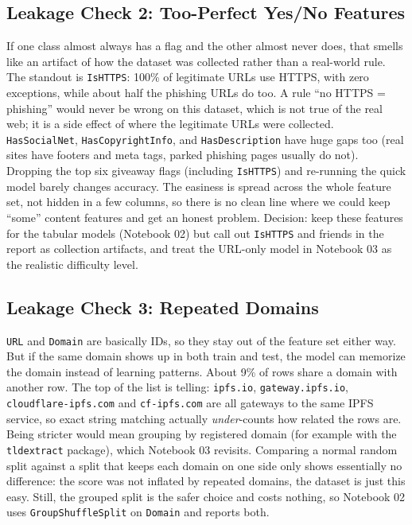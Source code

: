 \documentclass[stu,12pt,floatsintext]{apa7}
\newcommand{\code}[1]{\texttt{#1}}
\begin{document}
\subsection{Leakage Check 2: Too-Perfect Yes/No Features}

If one class almost always has a flag and the other almost never does,
that smells like an artifact of how the dataset was collected rather than
a real-world rule. The standout is \code{IsHTTPS}: 100\% of legitimate
URLs use HTTPS, with zero exceptions, while about half the phishing URLs
do too. A rule ``no HTTPS = phishing'' would never be wrong on this
dataset, which is not true of the real web; it is a side effect of where
the legitimate URLs were collected. \code{HasSocialNet},
\code{HasCopyrightInfo}, and \code{HasDescription} have huge gaps too
(real sites have footers and meta tags, parked phishing pages usually do
not). Dropping the top six giveaway flags (including \code{IsHTTPS}) and
re-running the quick model barely changes accuracy. The easiness is spread
across the whole feature set, not hidden in a few columns, so there is no
clean line where we could keep ``some'' content features and get an honest
problem. Decision: keep these features for the tabular models
(Notebook 02) but call out \code{IsHTTPS} and friends in the report as
collection artifacts, and treat the URL-only model in Notebook 03 as the
realistic difficulty level.

\subsection{Leakage Check 3: Repeated Domains}

\code{URL} and \code{Domain} are basically IDs, so they stay out of the
feature set either way. But if the same domain shows up in both train and
test, the model can memorize the domain instead of learning patterns.
About 9\% of rows share a domain with another row. The top of the list is
telling: \code{ipfs.io}, \code{gateway.ipfs.io}, \code{cloudflare-ipfs.com}
and \code{cf-ipfs.com} are all gateways to the same IPFS service, so exact
string matching actually \emph{under}-counts how related the rows are.
Being stricter would mean grouping by registered domain (for example with
the \code{tldextract} package), which Notebook 03 revisits. Comparing a
normal random split against a split that keeps each domain on one side
only shows essentially no difference: the score was not inflated by
repeated domains, the dataset is just this easy. Still, the grouped split
is the safer choice and costs nothing, so Notebook 02 uses
\code{GroupShuffleSplit} on \code{Domain} and reports both.
\end{document}
